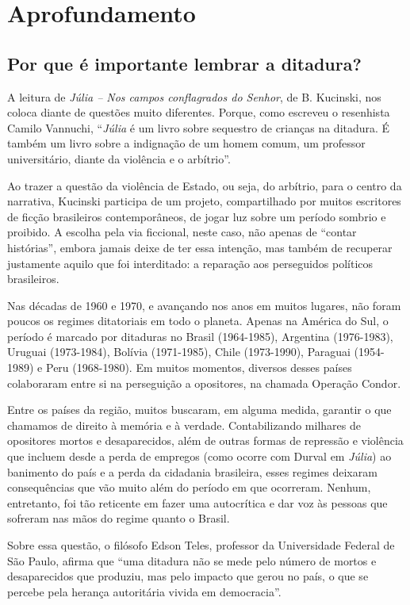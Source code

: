 \documentclass[12pt]{extarticle}
\begin{document}
\section{Aprofundamento}

\subsection{Por que é importante lembrar a ditadura?}

A leitura de \emph{Júlia -- Nos campos conflagrados do Senhor}, de B.
Kucinski, nos coloca diante de questões muito diferentes. Porque, como
escreveu o resenhista Camilo Vannuchi, ``\emph{Júlia} é um livro sobre
sequestro de crianças na ditadura. É também um livro sobre a indignação
de um homem comum, um professor universitário, diante da violência e o
arbítrio''.

Ao trazer a questão da violência de Estado, ou seja, do arbítrio, para o
centro da narrativa, Kucinski participa de um projeto, compartilhado por 
muitos escritores de ficção brasileiros contemporâneos, de jogar luz
sobre um período sombrio e proibido. A escolha pela via ficcional, neste
caso, não apenas de ``contar histórias'', embora jamais deixe de ter
essa intenção, mas também de recuperar justamente aquilo que foi
interditado: a reparação aos perseguidos políticos brasileiros.

Nas décadas de 1960 e 1970, e avançando nos anos em muitos lugares, não foram
poucos os regimes ditatoriais em todo o planeta. Apenas na América do Sul,
o período é marcado por ditaduras no Brasil (1964-1985), Argentina
(1976-1983), Uruguai (1973-1984), Bolívia (1971-1985), Chile
(1973-1990), Paraguai (1954-1989) e Peru (1968-1980). Em muitos
momentos, diversos desses países colaboraram entre si na perseguição a
opositores, na chamada Operação Condor.

Entre os países da região, muitos buscaram, em alguma medida,
garantir o que chamamos de direito à memória e à verdade. Contabilizando
milhares de opositores mortos e desaparecidos, além de outras formas de
repressão e violência que incluem desde a perda de empregos (como ocorre
com Durval em \emph{Júlia}) ao banimento do país e a perda da cidadania
brasileira, esses regimes deixaram consequências que vão muito além do
período em que ocorreram. Nenhum, entretanto, foi tão reticente em fazer uma
autocrítica e dar voz às pessoas que sofreram nas mãos do regime quanto
o Brasil.

Sobre essa questão, o filósofo Edson Teles, professor da Universidade
Federal de São Paulo, afirma que ``uma ditadura não se mede pelo número
de mortos e desaparecidos que produziu, mas pelo impacto que gerou no
país, o que se percebe pela herança autoritária vivida em democracia''.
\end{document}
